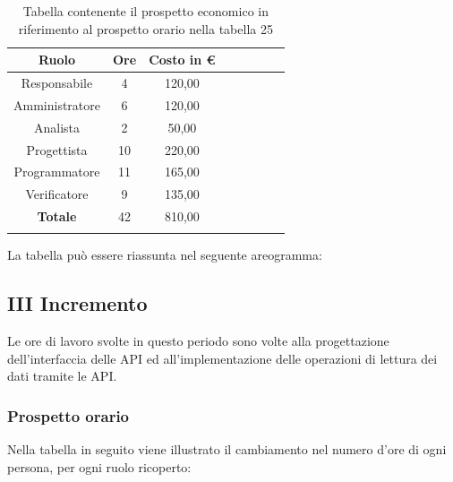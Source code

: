 			\begin{longtable}{|c|c|c|c|c|c|c|c}
				\hline
				\rowcolor{lighter-grayer}
				\textbf{Ruolo} & \textbf{Ore} & \textbf{Costo in €} \\
				\hline
				\endfirsthead
				\hline
			Responsabile 	    & 4 & 120,00\\
			\hline 
			\hline
			Amministratore	  & 6 & 120,00\\
			\hline
			\hline
			Analista 				& 2 & 50,00\\
			\hline
			\hline
			Progettista 		  & 10 & 220,00\\
			\hline
			\hline
			Programmatore 	 & 11 & 165,00\\
			\hline
			\hline
			Verificatore 		  & 9 & 135,00\\
			\hline
			\textbf{Totale} 	& 42 & 810,00\\
			\hline
				
				\caption{Tabella contenente il prospetto economico in riferimento al prospetto orario nella tabella 25}
			\end{longtable}
			\pagebreak
			
			La tabella può essere riassunta nel seguente areogramma:

		
		\subsection{III Incremento}
		Le ore di lavoro svolte in questo periodo sono volte alla progettazione dell'interfaccia delle API ed all'implementazione delle operazioni di lettura dei dati tramite le API.
		\subsubsection{Prospetto orario}
			Nella tabella in seguito viene illustrato il cambiamento nel numero d'ore di ogni persona, per ogni ruolo ricoperto:
			
